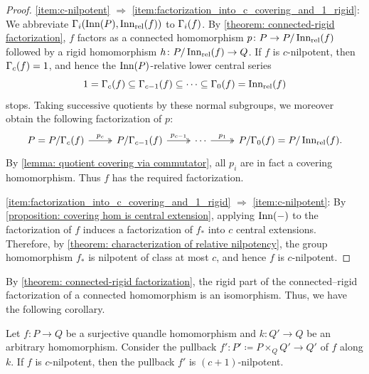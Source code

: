 \begin{proof}
\eqref{item:c-nilpotent} $\Rightarrow$ \eqref{item:factorization_into_c_covering_and_1_rigid}:
We abbreviate $\Gamma_i(\operatorname{Inn}(P),\operatorname{Inn_{rel}}(f))$ to $\Gamma_i(f)$. By \cref{theorem: connected-rigid factorization}, $f$ factors as a connected homomorphism $p\colon P\to P/\operatorname{Inn_{rel}}(f)$ followed by a rigid homomorphism $h\colon P/\operatorname{Inn_{rel}}(f) \to Q$. If $f$ is $c$-nilpotent, then $\Gamma_c(f)=1$, and hence the $\operatorname{Inn}(P)$-relative lower central series
\[ 1= \Gamma_c(f) \subseteq \Gamma_{c-1}(f) \subseteq \cdots \subseteq \Gamma_0(f) = \operatorname{Inn_{rel}}(f) \]
stops. Taking successive quotients by these normal subgroups, we moreover obtain the following factorization of $p$:
\[
\begin{tikzcd}
    P=P/\relLCS_c(f)
    \arrow[two heads]{r}{p_c}
    &
    P/\relLCS_{c-1}(f)
    \arrow[two heads]{r}{p_{c-1}}
    &
    \cdots
    \arrow[two heads]{r}{p_1}
    &
    P/\relLCS_0(f) = P/\relInn(f).
\end{tikzcd}
\]
By \cref{lemma: quotient covering via commutator}, all $p_i$ are in fact a covering homomorphism. Thus $f$ has the required factorization.

\eqref{item:factorization_into_c_covering_and_1_rigid} $\Rightarrow$ \eqref{item:c-nilpotent}: By \cref{proposition: covering hom is central extension}, applying $\operatorname{Inn}(-)$ to the factorization of $f$ induces a factorization of $f_*$ into $c$ central extensions. Therefore, by \cref{theorem: characterization of relative nilpotency}, the group homomorphism $f_*$ is nilpotent of class at most $c$, and hence $f$ is $c$-nilpotent.
\end{proof}

By \cref{theorem: connected-rigid factorization}, the rigid part of the connected--rigid factorization of a connected homomorphism is an isomorphism. Thus, we have the following corollary.


\begin{prop}
    Let $f\colon P\to Q$ be a surjective quandle homomorphism and $k\colon Q'\to Q$ be an arbitrary homomorphism. Consider the pullback $f'\colon P'\coloneqq P\times_Q Q'\to Q'$ of $f$ along $k$. If $f$ is $c$-nilpotent, then the pullback $f'$ is $(c+1)$-nilpotent.
\end{prop}

